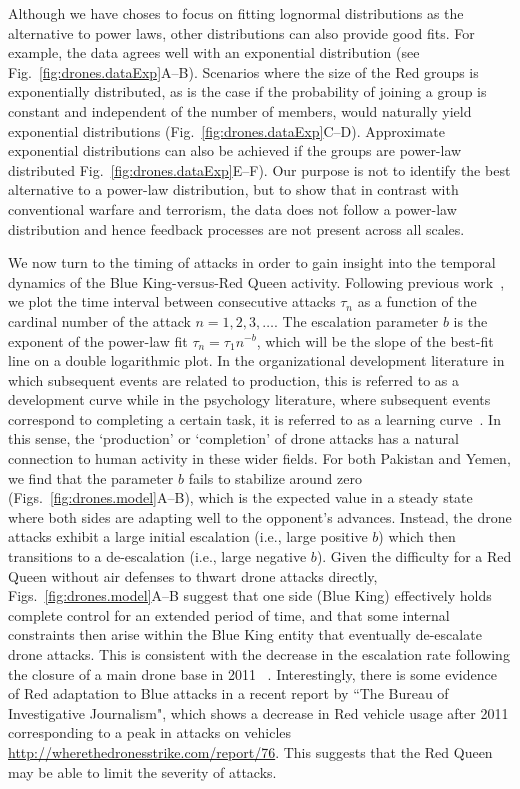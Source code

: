 \documentclass[preprint,12pt]{elsarticle}
\begin{document}
Although we have choses to focus on fitting lognormal distributions as the alternative to power laws, other distributions can also provide good fits. For example, the data agrees well with an exponential distribution (see Fig.~\ref{fig:drones.dataExp}A--B). Scenarios where the size of the Red groups is exponentially distributed, as is the case if the probability of joining a group is constant and independent of the number of members, would naturally yield exponential distributions (Fig.~\ref{fig:drones.dataExp}C--D). Approximate exponential distributions can also be achieved if the groups are power-law distributed Fig.~\ref{fig:drones.dataExp}E--F). Our purpose is not to identify the best alternative to a power-law distribution, but to show that in contrast with conventional warfare and terrorism, the data does not follow a power-law distribution and hence feedback processes are not present across all scales. 

We now turn to the timing of attacks in order to gain insight into the temporal
dynamics of the Blue King-versus-Red Queen activity. Following
previous work~\cite{Johnson2013b}, we plot the time interval between
consecutive attacks $\tau_n$ as a function of the cardinal number of
the attack $n=1,2,3,\dots$. The escalation parameter $b$ is the
exponent of the power-law fit $\tau_n = \tau_1 n^{-b}$, which will be
the slope of the best-fit line on a double logarithmic plot. In the
organizational development literature in which subsequent events are related to production, this is referred to as a development curve
while in the psychology literature, where subsequent events correspond
to completing a certain task, it is referred to as a learning 
curve~\cite{Johnson2011a}. In this sense, the `production' or `completion'
of drone attacks has a natural connection to human activity in these
wider fields. For both Pakistan and Yemen, we find that the
parameter $b$ fails to stabilize around zero 
(Figs.~\ref{fig:drones.model}A--B), which is the expected value in a steady state where both sides are adapting well to the opponent's advances.
Instead, the
drone attacks exhibit a large initial escalation (i.e., large positive
$b$) which then transitions to a de-escalation (i.e., large negative
$b$). Given the difficulty for a Red Queen without air defenses to thwart drone attacks
directly, Figs.~\ref{fig:drones.model}A--B suggest that one side (Blue King) effectively
holds complete control for an extended period of time, and that some
internal constraints then arise within the Blue King entity that
eventually de-escalate drone attacks. This is consistent with the decrease in the escalation rate following the closure of a main drone base in 2011 ~\cite{benjamin2013drone}. Interestingly, there is some evidence of Red adaptation to Blue attacks in a recent report by ``The Bureau of Investigative Journalism", which shows a decrease in Red vehicle usage after 2011 corresponding to a peak in attacks on vehicles \url{http://wherethedronesstrike.com/report/76}. This suggests that the Red Queen may be able to limit the severity of attacks.
\end{document}
